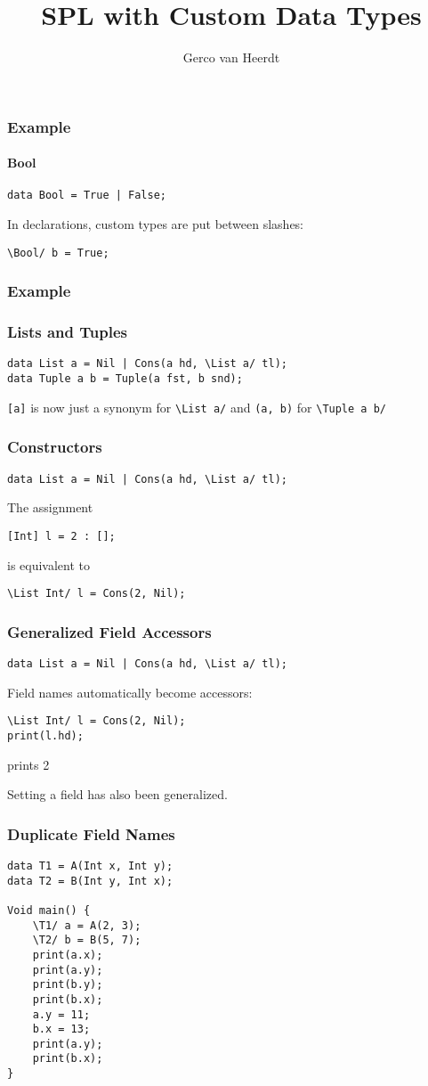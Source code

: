 \documentclass[12pt]{beamer}
\title{SPL with Custom Data Types}
\author{Gerco van Heerdt}
\begin{document}
\frame{\titlepage}

\begin{frame}[fragile]
    \frametitle{Example}
    \framesubtitle{Bool}
    \begin{verbatim}
data Bool = True | False;\end{verbatim}
    In declarations, custom types are put between slashes:
    \begin{verbatim}
\Bool/ b = True;\end{verbatim}
\end{frame}

\begin{frame}[fragile]
    \frametitle{Example}
    \frametitle{Lists and Tuples}
    \begin{verbatim}
data List a = Nil | Cons(a hd, \List a/ tl);
data Tuple a b = Tuple(a fst, b snd);\end{verbatim}
    \verb+[a]+ is now just a synonym for \verb+\List a/+ and \verb+(a, b)+ for \verb+\Tuple a b/+
\end{frame}

\begin{frame}[fragile]
    \frametitle{Constructors}
    \begin{verbatim}
data List a = Nil | Cons(a hd, \List a/ tl);\end{verbatim}
    The assignment
    \begin{verbatim}
[Int] l = 2 : [];\end{verbatim}
    is equivalent to
    \begin{verbatim}
\List Int/ l = Cons(2, Nil);\end{verbatim}
\end{frame}

\begin{frame}[fragile]
    \frametitle{Generalized Field Accessors}
    \begin{verbatim}
data List a = Nil | Cons(a hd, \List a/ tl);\end{verbatim}
    Field names automatically become accessors:
    \begin{verbatim}
\List Int/ l = Cons(2, Nil);
print(l.hd);\end{verbatim}
    prints 2

    Setting a field has also been generalized.
\end{frame}

\begin{frame}[fragile]
    \frametitle{Duplicate Field Names}
    \begin{verbatim}
data T1 = A(Int x, Int y);
data T2 = B(Int y, Int x);

Void main() {
    \T1/ a = A(2, 3);
    \T2/ b = B(5, 7);
    print(a.x);
    print(a.y);
    print(b.y);
    print(b.x);
    a.y = 11;
    b.x = 13;
    print(a.y);
    print(b.x);
}\end{verbatim}
\end{frame}
\end{document}
